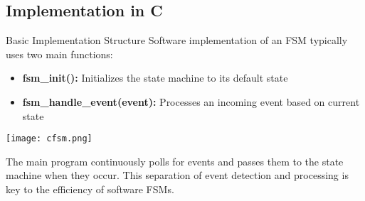 \raggedcolumns
\columnbreak

\subsection{Implementation in C}

\begin{concept}{Basic Implementation Structure}
Software implementation of an FSM typically uses two main functions:
\begin{itemize}
    \item \textbf{fsm\_init():} Initializes the state machine to its default state
    \item \textbf{fsm\_handle\_event(event):} Processes an incoming event based on current state
\end{itemize}
\texttt{[image: cfsm.png]}

The main program continuously polls for events and passes them to the state machine when they occur. This separation of event detection and processing is key to the efficiency of software FSMs.
\end{concept}

